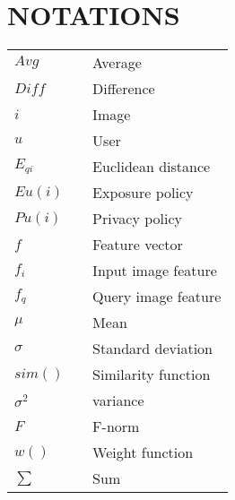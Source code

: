 \chapter*{NOTATIONS}
\begin{tabular}{lll}
$Avg$        &	 \hspace{0.75in} 	&	 Average  \\
$Diff$        &	 \hspace{0.75in} 	&	 Difference  \\
$i$        &	 \hspace{0.75in} 	&	Image \\
$u$        &	 \hspace{0.75in} 	&	 User \\
$E_{qi}$        &	 \hspace{0.75in} 	&	Euclidean distance\\
$Eu(i)$        &	 \hspace{0.75in} 	&	 Exposure policy \\
$Pu(i)$        &	 \hspace{0.75in} 	&	 Privacy policy \\
$f$        &	 \hspace{0.75in} 	&	Feature vector  \\
$f_{i}$        &	 \hspace{0.75in} 	&	 Input image feature\\
$f_{q}$        &	 \hspace{0.75in} 	&		Query image feature\\ %
$\mu$        &	 \hspace{0.75in} 	&	 Mean \\
$\sigma$        &	 \hspace{0.75in} 	&	 Standard deviation\\
$sim()$        &	 \hspace{0.75in} 	&	Similarity function	     \\
$\sigma^{2}$        &	 \hspace{0.75in} 	&	 variance\\
$F$        &	 \hspace{0.75in} 	&	F-norm\\
$w()$        &	 \hspace{0.75in} 	&	 Weight function  \\
$\sum $        &	 \hspace{0.75in} 	&	 Sum \\ 
   

\end{tabular}
